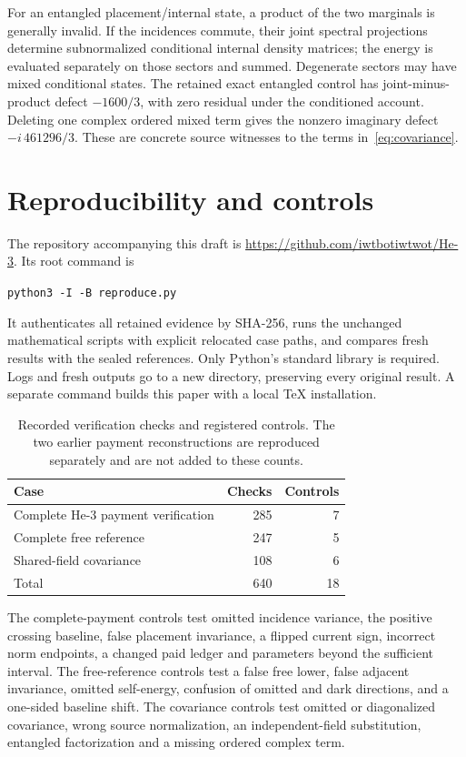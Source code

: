 \documentclass[11pt]{article}
\theoremstyle{definition}
\newcommand{\repo}{\url{https://github.com/iwtbotiwtwot/He-3}}
\begin{document}
For an entangled placement/internal state, a product of the two marginals is generally invalid. If the incidences commute, their joint spectral projections determine subnormalized conditional internal density matrices; the energy is evaluated separately on those sectors and summed. Degenerate sectors may have mixed conditional states. The retained exact entangled control has joint-minus-product defect $-1600/3$, with zero residual under the conditioned account. Deleting one complex ordered mixed term gives the nonzero imaginary defect $-i\,461296/3$. These are concrete source witnesses to the terms in~\eqref{eq:covariance}.

\section{Reproducibility and controls}\label{sec:repro}

The repository accompanying this draft is \repo. Its root command is
\begin{center}\texttt{python3 -I -B reproduce.py}\end{center}
It authenticates all retained evidence by SHA-256, runs the unchanged mathematical scripts with explicit relocated case paths, and compares fresh results with the sealed references. Only Python's standard library is required. Logs and fresh outputs go to a new directory, preserving every original result. A separate command builds this paper with a local TeX installation.

\begin{table}[ht]
\centering
\caption{Recorded verification checks and registered controls. The two earlier payment reconstructions are reproduced separately and are not added to these counts.}\label{tab:checks}
\begin{tabular}{@{}lrr@{}}\toprule
Case & Checks & Controls\\\midrule
Complete He-3 payment verification &285&7\\
Complete free reference &247&5\\
Shared-field covariance &108&6\\\midrule
Total &640&18\\\bottomrule
\end{tabular}
\end{table}

The complete-payment controls test omitted incidence variance, the positive crossing baseline, false placement invariance, a flipped current sign, incorrect norm endpoints, a changed paid ledger and parameters beyond the sufficient interval. The free-reference controls test a false free lower, false adjacent invariance, omitted self-energy, confusion of omitted and dark directions, and a one-sided baseline shift. The covariance controls test omitted or diagonalized covariance, wrong source normalization, an independent-field substitution, entangled factorization and a missing ordered complex term.
\end{document}
